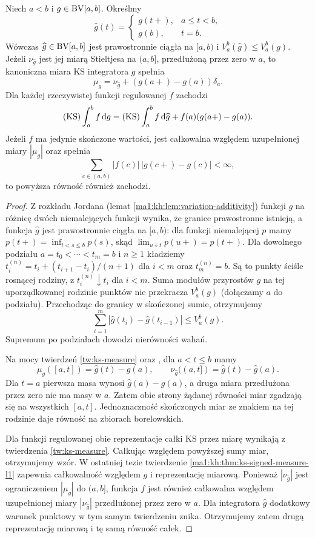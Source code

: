 \begin{twierdzenie}
\label{it:thm:ks-right-normalization-endpoint}
Niech $a<b$ i $g\in\mathrm{BV}[a,b]$. Określmy
\[
 \widehat g(t)=
 \begin{cases}g(t+),&a\le t<b,\\g(b),&t=b.\end{cases}
\]
Wówczas $\widehat g\in\mathrm{BV}[a,b]$ jest prawostronnie
ciągła na $[a,b)$ i $V_a^b(\widehat g)\le V_a^b(g)$.
Jeżeli $\nu_{\widehat g}$ jest jej miarą Stieltjesa
na $(a,b]$, przedłużoną przez zero w $a$, to
kanoniczna miara KS integratora $g$ spełnia
\[
 \mu_g=\nu_{\widehat g}+
           (g(a+)-g(a))\delta_a.
\]
Dla każdej rzeczywistej funkcji regulowanej $f$ zachodzi
\[
 (\mathrm{KS})\int_a^b f\,\mathrm dg
 =(\mathrm{KS})\int_a^b f\,\mathrm d\widehat g
    + f(a)(g(a+)-g(a)).
\]
Jeżeli $f$ ma jedynie skończone wartości, jest całkowalna
względem uzupełnionej miary $|\mu_g|$ oraz spełnia
\[
 \sum_{c\in(a,b)}|f(c)|\,|g(c+)-g(c)|<\infty,
\]
to powyższa równość również zachodzi.
\end{twierdzenie}
\begin{proof}
Z rozkładu Jordana (lemat
\ref{ma1:kh:lem:variation-additivity}) funkcji $g$
na różnicę dwóch niemalejących funkcji wynika,
że granice prawostronne istnieją, a funkcja $\widehat g$ jest prawostronnie
ciągła na $[a,b)$: dla funkcji niemalejącej $p$
mamy $p(t+)=\inf_{t<s\le b}p(s)$, skąd
$\lim_{u\downarrow t}p(u+)=p(t+)$.
Dla dowolnego podziału $a=t_0<\cdots<t_m=b$
i $n\ge1$ kładziemy
$t_i^{(n)}=t_i+(t_{i+1}-t_i)/(n+1)$ dla $i<m$
oraz $t_m^{(n)}=b$. Są to punkty ściśle rosnącej
rodziny, z $t_i^{(n)}\downarrow t_i$ dla $i<m$.
Suma modułów przyrostów $g$ na tej uporządkowanej
rodzinie punktów nie przekracza $V_a^b(g)$
(dołączamy $a$ do podziału). Przechodząc do granicy
w skończonej sumie, otrzymujemy
\[
 \sum_{i=1}^m|\widehat g(t_i)-\widehat g(t_{i-1})|
 \le V_a^b(g).
\]
Supremum po podziałach dowodzi nierówności wahań.

Na mocy twierdzeń \ref{tw:ks-measure} oraz
, dla $a<t\le b$
mamy
\[
 \mu_g([a,t])=\widehat g(t)-g(a),\qquad
 \nu_{\widehat g}((a,t])=\widehat g(t)-\widehat g(a).
\]
Dla $t=a$ pierwsza masa wynosi
$\widehat g(a)-g(a)$, a druga miara przedłużona
przez zero nie ma masy w $a$.
Zatem obie strony żądanej równości miar zgadzają
się na wszystkich $[a,t]$. Jednoznaczność
skończonych miar ze znakiem na tej rodzinie
daje równość na zbiorach borelowskich.

Dla funkcji regulowanej obie reprezentacje
całki KS przez miarę wynikają z twierdzenia
\ref{tw:ks-measure}. Całkując względem powyższej
sumy miar, otrzymujemy wzór.
W ostatniej tezie twierdzenie
\ref{ma1:kh:thm:ks-signed-measure-l1} zapewnia
całkowalność względem $g$ i reprezentację miarową.
Ponieważ $|\nu_{\widehat g}|$ jest ograniczeniem
$|\mu_g|$ do $(a,b]$, funkcja $f$ jest również
całkowalna względem uzupełnionej miary
$|\nu_{\widehat g}|$ przedłużonej przez zero w $a$.
Dla integratora $\widehat g$ dodatkowy warunek
punktowy w tym samym twierdzeniu znika.
Otrzymujemy zatem drugą reprezentację miarową
i tę samą równość całek.
\end{proof}
